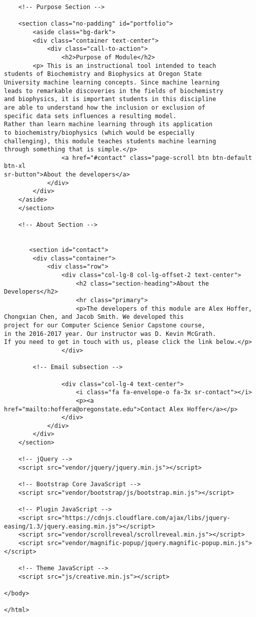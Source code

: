 \documentclass[onecolumn, draftclsnofoot,10pt, compsoc]{IEEEtran}
\begin{document}
\begin{lstlisting}
	<!-- Purpose Section -->

	<section class="no-padding" id="portfolio">
        <aside class="bg-dark">
        <div class="container text-center">
            <div class="call-to-action">
                <h2>Purpose of Module</h2>
		<p> This is an instructional tool intended to teach 
students of Biochemistry and Biophysics at Oregon State 
University machine learning concepts. Since machine learning 
leads to remarkable discoveries in the fields of biochemistry 
and biophysics, it is important students in this discipline 
are able to understand how the inclusion or exclusion of 
specific data sets influences a resulting model. 
Rather than learn machine learning through its application 
to biochemistry/biophysics (which would be especially 
challenging), this module teaches students machine learning 
through something that is simple.</p>
                <a href="#contact" class="page-scroll btn btn-default btn-xl 
sr-button">About the developers</a>
            </div>
        </div>
    </aside>
    </section>

	<!-- About Section -->


       <section id="contact">
        <div class="container">
            <div class="row">
                <div class="col-lg-8 col-lg-offset-2 text-center">
                    <h2 class="section-heading">About the Developers</h2>
                    <hr class="primary">
                    <p>The developers of this module are Alex Hoffer, 
Chongxian Chen, and Jacob Smith. We developed this 
project for our Computer Science Senior Capstone course, 
in the 2016-2017 year. Our instructor was D. Kevin McGrath. 
If you need to get in touch with us, please click the link below.</p>
                </div>
                
		<!-- Email subsection -->

                <div class="col-lg-4 text-center">
                    <i class="fa fa-envelope-o fa-3x sr-contact"></i>
                    <p><a href="mailto:hoffera@oregonstate.edu">Contact Alex Hoffer</a></p>
                </div>
            </div>
        </div>
    </section>

    <!-- jQuery -->
    <script src="vendor/jquery/jquery.min.js"></script>

    <!-- Bootstrap Core JavaScript -->
    <script src="vendor/bootstrap/js/bootstrap.min.js"></script>

    <!-- Plugin JavaScript -->
    <script src="https://cdnjs.cloudflare.com/ajax/libs/jquery-easing/1.3/jquery.easing.min.js"></script>
    <script src="vendor/scrollreveal/scrollreveal.min.js"></script>
    <script src="vendor/magnific-popup/jquery.magnific-popup.min.js"></script>

    <!-- Theme JavaScript -->
    <script src="js/creative.min.js"></script>

</body>

</html>
\end{lstlisting}
\end{document}
